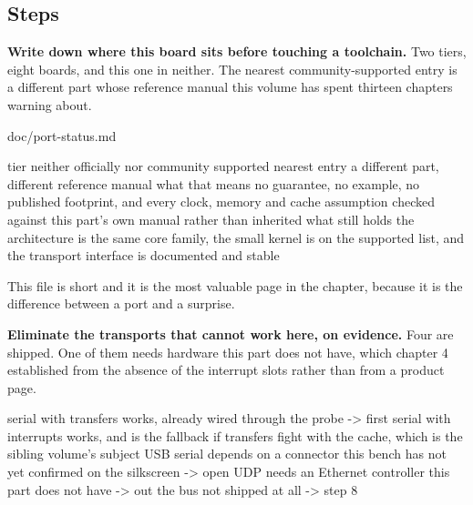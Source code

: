 \subsection*{Steps}

\begin{steps}
\item \textbf{Write down where this board sits before touching a toolchain.}
Two tiers, eight boards, and this one in neither. The nearest community-supported
entry is a different part whose reference manual this volume has spent thirteen
chapters warning about.
\begin{plaincode}
doc/port-status.md

  tier                 neither officially nor community supported
  nearest entry        a different part, different reference manual
  what that means      no guarantee, no example, no published footprint,
                       and every clock, memory and cache assumption checked
                       against this part's own manual rather than inherited
  what still holds     the architecture is the same core family, the small
                       kernel is on the supported list, and the transport
                       interface is documented and stable
\end{plaincode}
This file is short and it is the most valuable page in the chapter, because it
is the difference between a port and a surprise.

\item \textbf{Eliminate the transports that cannot work here, on evidence.} Four
are shipped. One of them needs hardware this part does not have, which chapter 4
established from the absence of the interrupt slots rather than from a product
page.
\begin{plaincode}
serial with transfers     works, already wired through the probe      -> first
serial with interrupts    works, and is the fallback if transfers fight
                          with the cache, which is the sibling volume's
                          subject
USB serial                depends on a connector this bench has not yet
                          confirmed on the silkscreen                 -> open
UDP                       needs an Ethernet controller this part does not
                          have                                        -> out
the bus                   not shipped at all                          -> step 8
\end{plaincode}


\end{steps}
